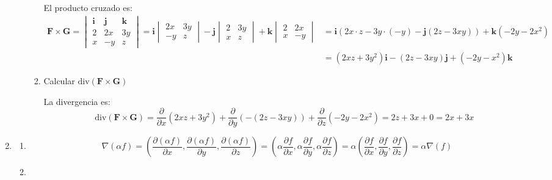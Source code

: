 \begin{enumerate}[label=\color{red}\textbf{\arabic*)}]
\begin{enumerate}[label=\color{red}\textbf{\alph*)}]
\begin{enumerate}[label=Paso \arabic*:]
          El producto cruzado es: \[
          \begin{aligned}
          \mathbf{F} \times \mathbf{G} =\begin{vmatrix} 
            \mathbf{i}  & \mathbf{j} &\mathbf{k} \\
            2 & 2x & 3y\\
            x & -y & z
          \end{vmatrix}=\mathbf{i} \begin{vmatrix} 
            2x & 3y\\
            -y & z
          \end{vmatrix} -\mathbf{j} \begin{vmatrix} 
            2 & 3y\\
            x & z
          \end{vmatrix}  +\mathbf{k} \begin{vmatrix} 
            2 & 2x\\
            x & -y
          \end{vmatrix} &=\mathbf{i} (2x\cdot z-3y\cdot (-y)-\mathbf{j} (2z-3xy))+\mathbf{k} (-2y-2x^2)\\
          &=(2xz+3y^2)\mathbf{i} -(2z-3xy)\mathbf{j} +(-2y-x^2)\mathbf{k}
          \end{aligned}
          \] 
        \item Calcular $\mathrm{div} (\mathbf{F} \times \mathbf{G} )$

          La divergencia es:
          \[
          \mathrm{div} (\mathbf{F} \times \mathbf{G} )=\frac{\partial }{\partial x} (2xz+3y^2)+\frac{\partial }{\partial y} (-(2z-3xy))+\frac{\partial }{\partial z} (-2y-2x^2)=2z+3x+0=2x+3x
          \] 
      \end{enumerate}
  \end{enumerate}

\item {} 
  \begin{enumerate}[label=\color{red}\textbf{\alph*)}]
    \item {} 

      \[
        \nabla (\alpha f)=\left( \frac{\partial (\alpha f)}{\partial x} ,\frac{\partial (\alpha f)}{\partial y},\frac{\partial (\alpha f)}{\partial z}   \right) =\left(\alpha \frac{\partial f}{\partial x} ,\alpha \frac{\partial f}{\partial y} ,\alpha \frac{\partial f}{\partial z}\right)=\alpha \left( \frac{\partial f}{\partial x} ,\frac{\partial f}{\partial y} ,\frac{\partial f}{\partial z}  \right) =\alpha \nabla (f)
      \] 
    \item {} 


\end{enumerate}
\end{enumerate}
